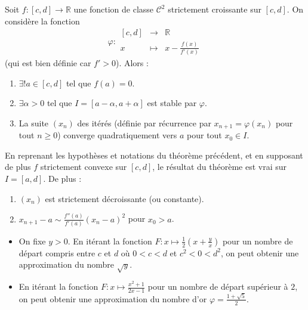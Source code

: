   \begin{theorem}
    Soit $f : [c, d] \rightarrow \mathbb{R}$ une fonction de classe $\mathcal{C}^2$ strictement croissante sur $[c, d]$. On considère la fonction
    \[ \varphi :
    \begin{array}{ccc}
      [c, d] &\rightarrow& \mathbb{R} \\
      x &\mapsto& x - \frac{f(x)}{f'(x)}
    \end{array}
    \]
    (qui est bien définie car $f' > 0$). Alors :
    \begin{enumerate}[label=(\roman*)]
      \item $\exists! a \in [c, d]$ tel que $f(a) = 0$.
      \item $\exists \alpha > 0$ tel que $I = [a - \alpha, a + \alpha]$ est stable par $\varphi$.
      \item La suite $(x_n)$ des itérés (définie par récurrence par $x_{n+1} = \varphi(x_n)$ pour tout $n \geq 0$) converge quadratiquement vers $a$ pour tout $x_0 \in I$.
    \end{enumerate}
  \end{theorem}

  \begin{corollary}
    En reprenant les hypothèses et notations du théorème précédent, et en supposant de plus $f$ strictement convexe sur $[c, d]$, le résultat du théorème est vrai sur $I = [a, d]$. De plus :
    \begin{enumerate}[label=(\roman*)]
      \item $(x_n)$ est strictement décroissante (ou constante).
      \item $x_{n+1} - a \sim \frac{f''(a)}{f'(a)} (x_n - a)^2$ pour $x_0 > a$.
    \end{enumerate}
  \end{corollary}

  \begin{example}
    \begin{itemize}
      \item On fixe $y > 0$. En itérant la fonction $F : x \mapsto \frac{1}{2} \left( x + \frac{y}{x} \right)$ pour un nombre de départ compris entre $c$ et $d$ où $0 < c < d$ et $c^2 < 0 < d^2$, on peut obtenir une approximation du nombre $\sqrt{y}$.
      \item En itérant la fonction $F : x \mapsto \frac{x^2+1}{2x-1}$ pour un nombre de départ supérieur à $2$, on peut obtenir une approximation du nombre d'or $\varphi = \frac{1+\sqrt{5}}{2}$.
    \end{itemize}
  \end{example}

